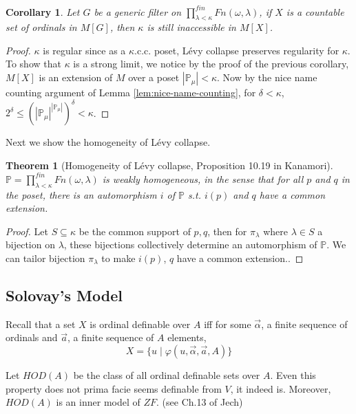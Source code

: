 \documentclass{article}
\newtheorem{theorem}{Theorem}
\newtheorem{corollary}{Corollary}
\newcommand{\bbP}{\mathbb{P}}
\begin{document}
\begin{corollary}\label{cor:kappa-is-inaccessible}
    Let $G$ be a generic filter on $\prod^{fin}_{\lambda<\kappa}Fn(\omega, \lambda)$, if $X$ is a countable set of ordinals in $M[G]$, then $\kappa$ is still inaccessible in $M[X]$.
\end{corollary}

\begin{proof}
    $\kappa$ is regular since as a $\kappa$.c.c. poset, L\'evy collapse preserves regularity for $\kappa$. To show that $\kappa$ is a strong limit, we notice by the proof of the previous corollary, $M[X]$ is an extension of $M$ over a poset $|\bbP_\mu|<\kappa$. Now by the nice name counting argument of Lemma \ref{lem:nice-name-counting}, for $\delta<\kappa$, $2^\delta \leq (|\bbP_\mu|^{|\bbP_\mu|})^{\delta}<\kappa$.
\end{proof}

Next we show the homogeneity of L\'evy collapse.

\begin{theorem}[Homogeneity of L\'evy collapse, Proposition 10.19 in Kanamori]
     $\bbP = \prod^{fin}_{\lambda<\kappa}Fn(\omega,\lambda)$ is weakly homogeneous, in the sense that for all $p$ and $q$ in the poset, there is an automorphism $i$ of $\bbP$ s.t. $i(p)$ and $q$ have a common extension.
\end{theorem}

\begin{proof}
    Let $S\subseteq \kappa$ be the common support of $p,q$, then for $\pi_\lambda$ where $\lambda\in S$ a bijection on $\lambda$, these bijections collectively determine an automorphism of $\bbP$. We can tailor bijection $\pi_\lambda$ to make $i(p)$, $q$ have a common extension..
\end{proof}

\subsection{Solovay's Model}

Recall that a set $X$ is ordinal definable over $A$ iff for some $\vec{\alpha}$, a finite sequence of ordinals and $\vec{a}$, a finite sequence of $A$ elements, $$X = \{u\mid \varphi(u,\vec{\alpha},\vec{a},A)\}$$


Let $HOD(A)$ be the class of all ordinal definable sets over $A$. Even this property does not prima facie seems definable from $V$, it indeed is. Moreover, $HOD(A)$ is an inner model of $ZF$. (see Ch.13 of Jech)
\end{document}
